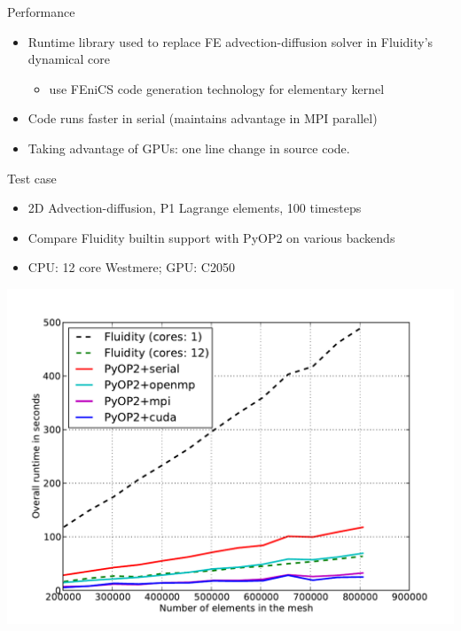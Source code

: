 \documentclass[presentation]{beamer}
\begin{document}
\begin{frame}[label={sec:orgheadline17}]{Performance}
\begin{itemize}
\item Runtime library used to replace FE advection-diffusion solver in
Fluidity's dynamical core
\begin{itemize}
\item use FEniCS code generation technology for elementary kernel
\end{itemize}
\item Code runs faster in serial (maintains advantage in MPI parallel)
\item Taking advantage of GPUs: one line change in source code.
\end{itemize}
\end{frame}

\begin{frame}[label={sec:orgheadline18}]{Test case}
\begin{itemize}
\item 2D Advection-diffusion, P1 Lagrange elements, 100 timesteps
\item Compare Fluidity builtin support with PyOP2 on various backends
\item CPU: 12 core Westmere; GPU: C2050
\end{itemize}
\begin{center}
\includegraphics[height=0.7\textheight]{04-11-EASC-PyOP2-fluidity.figures/runtime_linear}
\end{center}
\end{frame}
\end{document}
